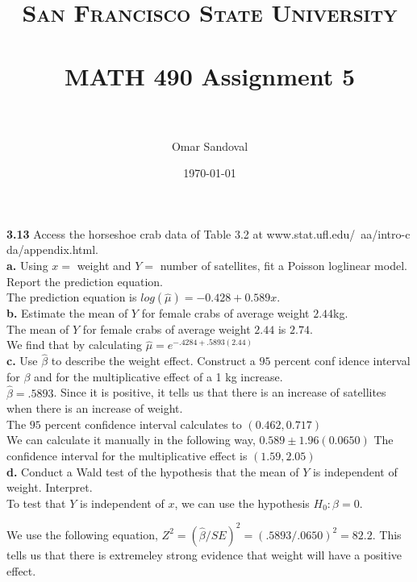 \documentclass[paper=letter, fontsize=11pt]{scrartcl} %
\title{	
\normalfont \normalsize 
\textsc{San Francisco State University} \\ [25pt]
\horrule{0.5pt} \\[0.4cm] %
\huge MATH 490 Assignment 5  \\ %
\horrule{2pt} \\[0.5cm] %
}
\author{Omar Sandoval}
\date{\normalsize\today}
\begin{document}
\maketitle

\textbf{3.13} Access the horseshoe crab data of Table 3.2 at www.stat.ufl.edu/~aa/intro-c
da/appendix.html. \\
\textbf{a.} Using $x =$ weight and $Y =$ number of satellites, fit a Poisson loglinear
model. Report the prediction equation. \\

The prediction equation is $log(\hat{\mu}) = -0.428 + 0.589x$.
\\

\textbf{b.} Estimate the mean of $Y$ for female crabs of average weight $2.44$kg. \\

The mean of $Y$ for female crabs of average weight $2.44$ is $2.74$. \\
We find that by calculating $\hat{\mu} = e^{-.4284+.5893(2.44)}$
\\

\textbf{c.} Use $\hat{\beta}$ to describe the weight effect. Construct a $95$ percent conf
idence interval for $\beta$ and for the multiplicative effect of a 1 kg increase. \\

$\hat{\beta} = .5893$. Since it is positive, it tells us that there is an increase 
of satellites when there is an increase of weight. \\

The $95$ percent confidence interval calculates to $(0.462, 0.717)$ \\
We can calculate it manually in the following way, $0.589 \pm 1.96(0.0650)$
The confidence interval for the multiplicative effect is $(1.59, 2.05)$ \\

\textbf{d.} Conduct a Wald test of the hypothesis that the mean of $Y$ is independent of 
weight. Interpret. \\

To test that $Y$ is independent of $x$, we can use the hypothesis $H_0 : \beta = 0$.

We use the following equation, $Z^2 = (\hat{\beta}/SE)^2 = (.5893/.0650)^2 = 82.2$.
This tells us that there is extremeley strong evidence that weight will have a positive 
effect. \\
\end{document}
